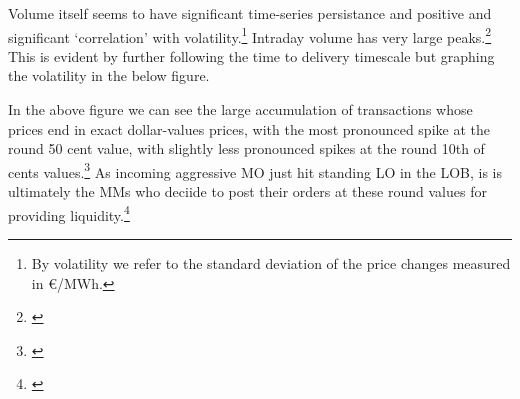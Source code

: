 \documentclass[12pt,a4paper]{cau_thesis}
\begin{document}
\begin{figure}[htbp]
    \vspace*{0.5cm}
    \centering
    \label{fig:intraday_volume_time_of_day}
\end{figure}
Volume itself seems to have significant time-series persistance and
positive and significant `correlation' with volatility.\footnote{By
    volatility we refer to the standard deviation of the price changes
    measured in €/MWh.} Intraday volume has very large
peaks.\footnote{\cite[See ][, p.64]{cartea2015algorithmic}} This is
evident by further following the time to delivery timescale but
graphing the volatility in the below figure.
\begin{figure}[htbp]
    \vspace*{0.5cm}
    \centering
    \label{fig:intraday_volatility}
\end{figure}

\begin{figure}[htbp]
    \vspace*{0.5cm}
    \centering
    \label{fig:price_pattern_cent_bounds}
\end{figure}
In the above figure we can see the large accumulation of transactions
whose prices end in exact dollar-values prices, with the most
pronounced spike at the round 50 cent value, with slightly less
pronounced spikes at the round 10th of cents
values.\footnote{\cite[See ][, p.64]{cartea2015algorithmic}} As
incoming aggressive MO just hit standing LO in the LOB, is is
ultimately the MMs who deciide to post their orders at these round
values for providing liquidity.\footnote{\cite[See ][,
        p.64]{cartea2015algorithmic}}
\end{document}
